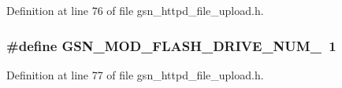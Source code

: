 Definition at line 76 of file gsn\_\-httpd\_\-file\_\-upload.h.

\hypertarget{a00512_a369bf64284f606db1280e9ba1ac1480a}{
\subsubsection[{GSN\_\-MOD\_\-FLASH\_\-DRIVE\_\-NUM\_\-1}]{\setlength{\rightskip}{0pt plus 5cm}\#define GSN\_\-MOD\_\-FLASH\_\-DRIVE\_\-NUM\_~1}}
\label{a00512_a369bf64284f606db1280e9ba1ac1480a}


Definition at line 77 of file gsn\_\-httpd\_\-file\_\-upload.h.

